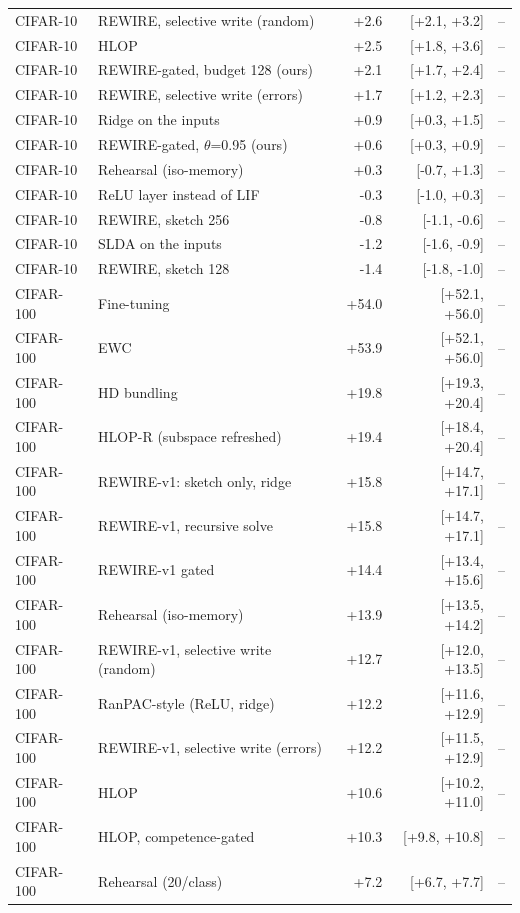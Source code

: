 \begin{tabular}{llrrr}
CIFAR-10 & REWIRE, selective write (random) & +2.6 & [+2.1, +3.2] & -- \\
CIFAR-10 & HLOP & +2.5 & [+1.8, +3.6] & -- \\
CIFAR-10 & REWIRE-gated, budget 128 (ours) & +2.1 & [+1.7, +2.4] & -- \\
CIFAR-10 & REWIRE, selective write (errors) & +1.7 & [+1.2, +2.3] & -- \\
CIFAR-10 & Ridge on the inputs & +0.9 & [+0.3, +1.5] & -- \\
CIFAR-10 & REWIRE-gated, $\theta$=0.95 (ours) & +0.6 & [+0.3, +0.9] & -- \\
CIFAR-10 & Rehearsal (iso-memory) & +0.3 & [-0.7, +1.3] & -- \\
CIFAR-10 & ReLU layer instead of LIF & -0.3 & [-1.0, +0.3] & -- \\
CIFAR-10 & REWIRE, sketch 256 & -0.8 & [-1.1, -0.6] & -- \\
CIFAR-10 & SLDA on the inputs & -1.2 & [-1.6, -0.9] & -- \\
CIFAR-10 & REWIRE, sketch 128 & -1.4 & [-1.8, -1.0] & -- \\
CIFAR-100 & Fine-tuning & +54.0 & [+52.1, +56.0] & -- \\
CIFAR-100 & EWC & +53.9 & [+52.1, +56.0] & -- \\
CIFAR-100 & HD bundling & +19.8 & [+19.3, +20.4] & -- \\
CIFAR-100 & HLOP-R (subspace refreshed) & +19.4 & [+18.4, +20.4] & -- \\
CIFAR-100 & REWIRE-v1: sketch only, ridge & +15.8 & [+14.7, +17.1] & -- \\
CIFAR-100 & REWIRE-v1, recursive solve & +15.8 & [+14.7, +17.1] & -- \\
CIFAR-100 & REWIRE-v1 gated & +14.4 & [+13.4, +15.6] & -- \\
CIFAR-100 & Rehearsal (iso-memory) & +13.9 & [+13.5, +14.2] & -- \\
CIFAR-100 & REWIRE-v1, selective write (random) & +12.7 & [+12.0, +13.5] & -- \\
CIFAR-100 & RanPAC-style (ReLU, ridge) & +12.2 & [+11.6, +12.9] & -- \\
CIFAR-100 & REWIRE-v1, selective write (errors) & +12.2 & [+11.5, +12.9] & -- \\
CIFAR-100 & HLOP & +10.6 & [+10.2, +11.0] & -- \\
CIFAR-100 & HLOP, competence-gated & +10.3 & [+9.8, +10.8] & -- \\
CIFAR-100 & Rehearsal (20/class) & +7.2 & [+6.7, +7.7] & -- \\

\end{tabular}
